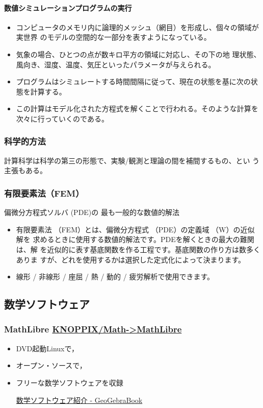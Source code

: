 \documentclass[dvipdfmx,11pat]{jarticle}
\begin{document}
\paragraph{数値シミュレーションプログラムの実行}
\label{sec:org266fa0d}
\begin{itemize}
\item コンピュータのメモリ内に論理的メッシュ（網目）を形成し、個々の領域が実世界
のモデルの空間的な一部分を表すようになっている。
\item 気象の場合、ひとつの点が数キロ平方の領域に対応し、その下の地
理状態、風向き、湿度、温度、気圧といったパラメータが与えられる。
\item プログラムはシミュレートする時間間隔に従って、現在の状態を基に次の状
態を計算する。
\item この計算はモデル化された方程式を解くことで行われる。そのような計算を
次々に行っていくのである。
\end{itemize}
\subsubsection{科学的方法}
\label{sec:orgf0da87d}
計算科学は科学の第三の形態で、実験/観測と理論の間を補間するもの、とい
う主張もある。
\subsubsection{有限要素法（FEM）}
\label{sec:orgf989c3e}
偏微分方程式ソルバ (PDE)の 最も一般的な数値的解法

\begin{itemize}
\item 有限要素法 （FEM）とは、偏微分方程式 （PDE）の定義域 （W）の近似解を
求めるときに使用する数値的解法です。PDEを解くときの最大の難関は、解
を近似的に表す基底関数を作る工程です。基底関数の作り方は数多くありま
すが、どれを使用するかは選択した定式化によって決まります。

\item 線形 / 非線形 / 座屈 / 熱 / 動的 / 疲労解析で使用できます。
\end{itemize}
\subsection{数学ソフトウェア}
\label{sec:orgaca8112}
\subsubsection{MathLibre  \href{https://www.geogebra.org/m/hShSTr6e}{KNOPPIX/Math->MathLibre}}
\label{sec:orgedc55e1}
\begin{itemize}
\item DVD起動Linuxで，
\item オープン・ソースで，
\item フリーな数学ソフトウェアを収録 

\href{https://www.geogebra.org/m/hShSTr6e}{数学ソフトウェア紹介 - GeoGebraBook}
\end{itemize}
\end{document}
